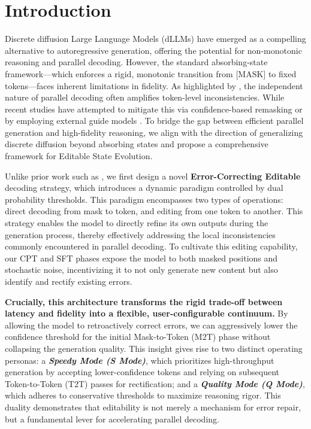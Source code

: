 \section{Introduction}

Discrete diffusion Large Language Models (dLLMs) have emerged as a compelling alternative to autoregressive generation, offering the potential for non-monotonic reasoning and parallel decoding. However, the standard absorbing-state framework—which enforces a rigid, monotonic transition from $\text{[MASK]}$ to fixed tokens—faces inherent limitations in fidelity. As highlighted by \citet{kang_parallelbench_2025}, the independent nature of parallel decoding often amplifies token-level inconsistencies. While recent studies have attempted to mitigate this via confidence-based remasking \citep{wang_remasking_2025} or by employing external guide models \citep{lee_effective_2025}. To bridge the gap between efficient parallel generation and high-fidelity reasoning, we align with the direction of generalizing discrete diffusion beyond absorbing states \citep{rutte_generalized_2025} and propose a comprehensive framework for Editable State Evolution.

Unlike prior work such as \citet{song2025seed}, we first design a novel \textbf{Error-Correcting Editable} decoding strategy, which introduces a dynamic paradigm controlled by dual probability thresholds. This paradigm encompasses two types of operations: direct decoding from mask to token, and editing from one token to another. This strategy enables the model to directly refine its own outputs during the generation process, thereby effectively addressing the local inconsistencies commonly encountered in parallel decoding. To cultivate this editing capability, our CPT and SFT phases expose the model to both masked positions and stochastic noise, incentivizing it to not only generate new content but also identify and rectify existing errors.

\textbf{Crucially, this architecture transforms the rigid trade-off between latency and fidelity into a flexible, user-configurable continuum.} By allowing the model to retroactively correct errors, we can aggressively lower the confidence threshold for the initial Mask-to-Token (M2T) phase without collapsing the generation quality. This insight gives rise to two distinct operating personas: a \textbf{\textit{Speedy Mode (S Mode)}}, which prioritizes high-throughput generation by accepting lower-confidence tokens and relying on subsequent Token-to-Token (T2T) passes for rectification; and a \textbf{\textit{Quality Mode (Q Mode)}}, which adheres to conservative thresholds to maximize reasoning rigor. This duality demonstrates that editability is not merely a mechanism for error repair, but a fundamental lever for accelerating parallel decoding.


